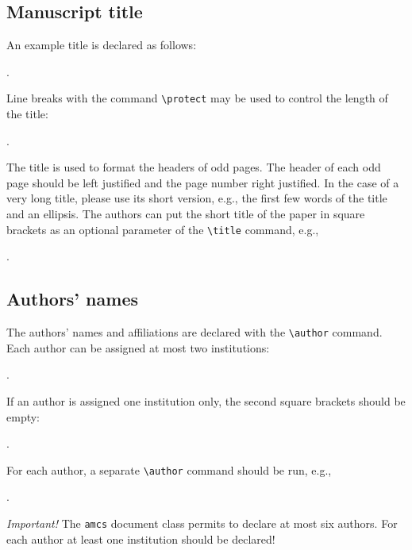 \documentclass{amcs}
\begin{document}
\subsection{Manuscript title}
\label{title}
An example title is declared as follows:

\medskip
{}.

\medskip\noindent
Line breaks with the command \verb+\protect+ may be used to control the length of the title:

\medskip
{}.

\medskip\noindent
The title is used to format the headers of odd pages. The header of each odd page should be left justified and the page number right justified. In the case of a very long title, please use its short version, e.g., the first few words of the title and an ellipsis. The authors can put the short title of the paper in square brackets as an optional parameter of the \verb+\title+ command, e.g.,

\medskip
{}.

\subsection{Authors' names}
The authors' names and affiliations are declared with the \verb+\author+ command. Each author can be assigned at most two institutions:

\medskip
{}.

\medskip\noindent
If an author is assigned one institution only, the second square brackets should be empty:

\medskip
{}.

\medskip\noindent
For each author, a separate \verb+\author+ command should be run, e.g.,

\medskip
{}
.

\medskip\noindent
\emph{Important!} The \verb+amcs+ document class permits to declare at most six authors.
For each author at least one institution should be declared!
\end{document}
